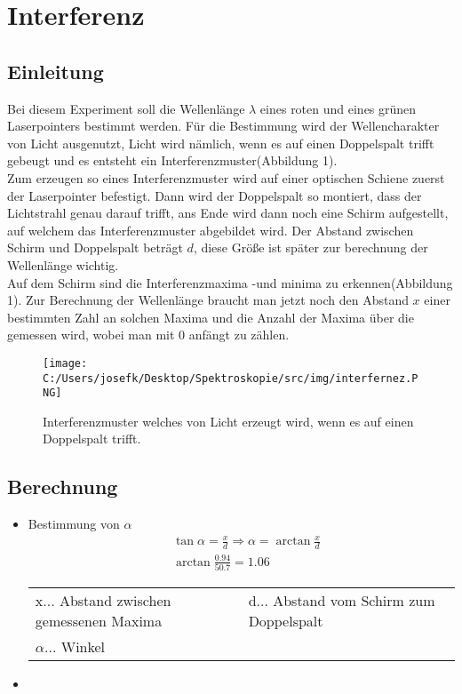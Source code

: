 \section{Interferenz}

\subsection{Einleitung}
Bei diesem Experiment soll die Wellenlänge $\lambda$ eines roten und eines grünen Laserpointers bestimmt werden.
Für die Bestimmung wird der Wellencharakter von Licht ausgenutzt, Licht wird nämlich, wenn es auf einen Doppelspalt trifft gebeugt und es entsteht ein Interferenzmuster(Abbildung 1).\\
Zum erzeugen so eines Interferenzmuster wird auf einer optischen Schiene zuerst der Laserpointer befestigt. Dann wird der Doppelspalt so montiert, dass der Lichtstrahl genau darauf trifft, 
ans Ende wird dann noch eine Schirm aufgestellt, auf welchem das Interferenzmuster abgebildet wird. Der Abstand zwischen Schirm und Doppelspalt beträgt $d$, diese Größe ist später
zur berechnung der Wellenlänge wichtig. \\
Auf dem Schirm sind die Interferenzmaxima -und minima zu erkennen(Abbildung 1). Zur Berechnung der Wellenlänge braucht man jetzt noch den Abstand $x$ einer bestimmten Zahl an solchen Maxima und die Anzahl
der Maxima über die gemessen wird, wobei man mit 0 anfängt zu zählen. 
\begin{figure}[H]
    \texttt{[image: C:/Users/josefk/Desktop/Spektroskopie/src/img/interfernez.PNG]}
    \caption{Interferenzmuster welches von Licht erzeugt wird, wenn es auf einen Doppelspalt trifft.}
\end{figure}

\subsection{Berechnung}
\begin{itemize}
    \item Bestimmung von $\alpha$
    \begin{align*}
        &\tan \alpha = \frac{x} {d} \Rightarrow \alpha = \arctan \frac{x} {d}\\
        &\arctan \frac{0.94}{50.7} = 1.06
    \end{align*}         
        \begin{tabular}{ll}
        x... Abstand zwischen gemessenen Maxima & d... Abstand vom Schirm zum Doppelspalt \\
        $\alpha$... Winkel &
        \end{tabular}  
    \item 
\end{itemize}

